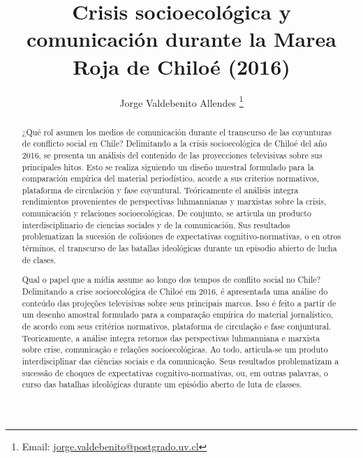 \documentclass{textolivre}
\title{Crisis socioecológica y comunicación durante la Marea Roja de Chiloé (2016)}
\author[1]{Jorge Valdebenito Allendes \orcid{0000-0003-3249-1855} \thanks{Email: \url{jorge.valdebenito@postgrado.uv.cl}}}
\affil[1]{Universidad de Valparaíso, Chile.}
\begin{document}
\maketitle

\begin{polyabstract}
\begin{abstract}
¿Qué rol asumen los medios de comunicación durante el transcurso de las
coyunturas de conflicto social en Chile? Delimitando a la crisis socioecológica de Chiloé
del año 2016, se presenta un análisis del contenido de las proyecciones televisivas sobre
sus principales hitos. Esto se realiza siguiendo un diseño muestral formulado para la
comparación empírica del material periodístico, acorde a sus criterios normativos,
plataforma de circulación y fase coyuntural. Teóricamente el análisis integra rendimientos
provenientes de perspectivas luhmannianas y marxistas sobre la crisis, comunicación y
relaciones socioecológicas. De conjunto, se articula un producto interdisciplinario de
ciencias sociales y de la comunicación. Sus resultados problematizan la sucesión de
colisiones de expectativas cognitivo-normativas, o en otros términos, el transcurso de las
batallas ideológicas durante un episodio abierto de lucha de clases.

\end{abstract}

\begin{portuguese}
\begin{abstract}
Qual o papel que a mídia assume ao longo dos tempos de conflito social no
Chile? Delimitando a crise socioecológica de Chiloé em 2016, é apresentada uma análise
do conteúdo das projeções televisivas sobre seus principais marcos. Isso é feito a partir
de um desenho amostral formulado para a comparação empírica do material jornalístico,
de acordo com seus critérios normativos, plataforma de circulação e fase conjuntural.
Teoricamente, a análise integra retornos das perspectivas luhmanniana e marxista sobre
crise, comunicação e relações socioecológicas. Ao todo, articula-se um produto
interdisciplinar das ciências sociais e da comunicação. Seus resultados problematizam a
sucessão de choques de expectativas cognitivo-normativas, ou, em outras palavras, o
curso das batalhas ideológicas durante um episódio aberto de luta de classes.

\end{abstract}
\end{portuguese}


\end{polyabstract}
\end{document}
